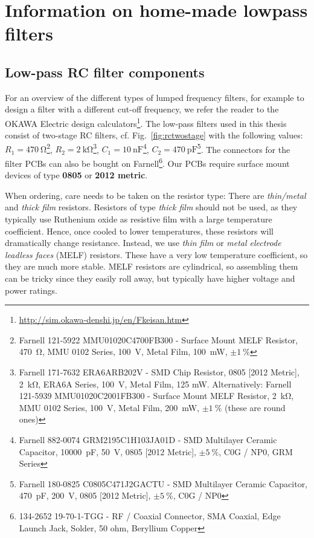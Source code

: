 \newchapstyle
\chapter{Information on home-made lowpass filters}
\afterpage{\pagecolor{none}}\newpage
\section{Low-pass RC filter components}\label{app:lowpassfilter}

For an overview of the different types of lumped frequency filters, for example to design a filter with a different cut-off frequency, we refer the reader to the OKAWA Electric design calculators\footnote{\url{http://sim.okawa-denshi.jp/en/Fkeisan.htm}}.
%
The low-pass filters used in this thesis consist of two-stage RC filters, cf. Fig.~\ref{fig:rctwostage} with the following values:
%
$R_1=\SI{470}{\ohm}$\footnote{Farnell 121-5922 MMU01020C4700FB300 - Surface Mount MELF Resistor, \SI{470}{\ohm}, MMU 0102 Series, \SI{100}{V}, Metal Film, \SI{100}{\milli\watt}, $\pm\SI{1}{\percent}$}, $R_2=\SI{2}{\kilo\ohm}$\footnote{Farnell 171-7632 ERA6ARB202V - SMD Chip Resistor, 0805 [2012 Metric], \SI{2}{\kilo\ohm}, ERA6A Series, \SI{100}{V}, Metal Film, 125 mW. Alternatively: Farnell 121-5939 MMU01020C2001FB300 - Surface Mount MELF Resistor, \SI{2}{\kilo\ohm}, MMU 0102 Series, \SI{100}{V}, Metal Film, \SI{200}{\milli\watt}, $\pm\SI{1}{\percent}$ (these are round ones)}, $C_1=\SI{10}{\nano\farad}$\footnote{Farnell 882-0074 GRM2195C1H103JA01D - SMD Multilayer Ceramic Capacitor, \SI{10000}{\pico\farad}, \SI{50}{V}, 0805 [2012 Metric], $\pm\SI{5}{\percent}$, C0G / NP0, GRM Series}, $C_2=\SI{470}{\pico\farad}$\footnote{Farnell 180-0825 C0805C471J2GACTU - SMD Multilayer Ceramic Capacitor, \SI{470}{\pico\farad}, \SI{200}{V}, 0805 [2012 Metric], $\pm\SI{5}{\percent}$, C0G / NP0}.
%
The connectors for the filter PCBs can also be bought on Farnell\footnote{134-2652 19-70-1-TGG - RF / Coaxial Connector, SMA Coaxial, Edge Launch Jack, Solder, 50 ohm, Beryllium Copper}.
%
Our PCBs require surface mount devices of type \textbf{0805} or \textbf{2012 metric}.

When ordering, care needs to be taken on the resistor type:
%
There are \textit{thin/metal} and \textit{thick film} resistors.
%
Resistors of type \textit{thick film} should not be used, as they typically use Ruthenium oxide as resistive film with a large temperature coefficient.
%
Hence, once cooled to lower temperatures, these resistors will dramatically change resistance.
%
Instead, we use \textit{thin film} or \textit{metal electrode leadless faces} (MELF) resistors.
%
These have a very low temperature coefficient, so they are much more stable.
%
MELF resistors are cylindrical, so assembling them can be tricky since they easily roll away, but typically have higher voltage and power ratings.

